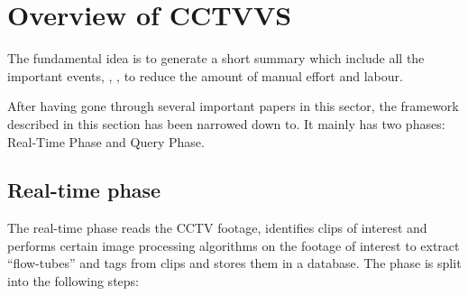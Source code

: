 \chapter{Overview of CCTVVS}
The fundamental idea is to generate a short summary which include all the
important events\cite{oh2005video}, \cite{nam1999video}, \cite{li2001overview},
\cite{Chu_2015_CVPR} to reduce the amount of manual effort and labour.

After having gone through several important papers in this sector, the framework
described in this section has been narrowed down to. It mainly has
two phases: Real-Time Phase and Query Phase.


\section{Real-time phase}
The real-time phase reads the CCTV footage, identifies clips of interest and
performs certain image processing algorithms on the footage of interest to
extract “flow-tubes” and tags from clips and stores them in a
database\cite{pritch2007webcam}. The phase is split into the following steps:

